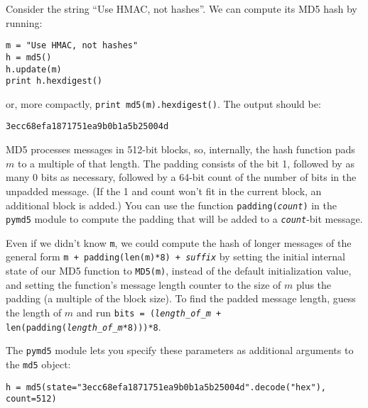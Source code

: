 \documentclass[letterpaper,12pt]{report}
\begin{document}
\medskip

Consider the string ``Use HMAC, not hashes''.  We can compute its MD5 hash by running:
\begin{mdframed}
\begin{verbatim}
m = "Use HMAC, not hashes"
h = md5()
h.update(m)
print h.hexdigest()
\end{verbatim}
\end{mdframed}

or, more compactly, \texttt{print md5(m).hexdigest()}.  The output should be:

\begin{mdframed}
\begin{verbatim}
3ecc68efa1871751ea9b0b1a5b25004d
\end{verbatim}
\end{mdframed}
 
MD5 processes messages in 512-bit blocks, so, internally,  the hash function pads $m$ to a multiple of that length.  The padding consists of the bit 1, followed by as many 0 bits as necessary, followed by a 64-bit count of the number of bits in the unpadded message. (If the 1 and count won't fit in the current block, an additional block is added.)  You can use the function \texttt{padding(\emph{count})} in the \texttt{pymd5} module to compute the padding that will be added to a \texttt{\emph{count}}-bit message.
 
\medskip

Even if we didn't know \texttt{m}, we could compute the hash of longer messages of the general form \texttt{m~+~padding(len(m)*8) + \emph{suffix}} by setting the initial internal state of our MD5 function to \texttt{MD5(m)}, instead of the default initialization value, and setting the function's message length counter to the size of $m$ plus the padding (a multiple of the block size).  To find the padded message length, guess the length of $m$ and run \texttt{bits = (\emph{length\_of\_m} + len(padding(\emph{length\_of\_m}*8)))*8}. 

\medskip

The \texttt{pymd5} module lets you specify these parameters as additional arguments to the \texttt{md5} object:
\begin{mdframed}
\begin{verbatim}
h = md5(state="3ecc68efa1871751ea9b0b1a5b25004d".decode("hex"), count=512)
\end{verbatim}
\end{mdframed}

\smallskip
 
\end{document}
